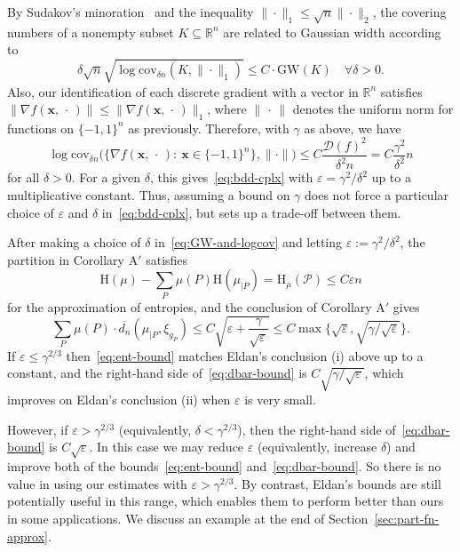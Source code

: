 \documentclass[aop,preprint]{imsart}
\theoremstyle{remark}
\renewcommand{\bf}[1]{\boldsymbol{#1}}
\renewcommand{\rm}[1]{\mathrm{#1}}
\renewcommand{\cal}[1]{\mathcal{#1}}
\newcommand{\bbR}{\mathbb{R}}
\newcommand{\rmH}{\mathrm{H}}
\renewcommand{\P}{\mathcal{P}}
\newcommand{\eps}{\varepsilon}
\newcommand{\g}{\gamma}
\newcommand{\ol}[1]{\overline{#1}}
\newcommand{\cov}{\mathrm{cov}}
\begin{document}
By Sudakov's minoration~\cite[Theorem 3.18]{LedTal--book} and the inequality $\|\cdot\|_1 \leq \sqrt{n}\|\cdot\|_2$, the covering numbers of a nonempty subset $K \subseteq \bbR^n$ are related to Gaussian width according to
\[\delta \sqrt{n}\sqrt{\log \cov_{\delta n}(K,\|\cdot\|_1)} \leq C\cdot  \rm{GW}(K) \quad \forall \delta > 0. \]
Also, our identification of each discrete gradient with a vector in $\bbR^n$ satisfies $\|\nabla f(\bf{x},\,\cdot\,)\| \leq \|\nabla f(\bf{x},\,\cdot\,)\|_1$, where $\|\,\cdot\,\|$ denotes the uniform norm for functions on $\{-1,1\}^n$ as previously.  Therefore, with $\g$ as above, we have
\begin{equation}\label{eq:GW-and-logcov}
\log \cov_{\delta n}\big(\{\nabla f(\bf{x},\,\cdot\,):\ \bf{x} \in \{-1,1\}^n\},\|\cdot\|\big) \leq C\frac{\cal{D}(f)^2}{\delta^2n} = C\frac{\g^2}{\delta^2}n
\end{equation}
for all $\delta > 0$. For a given $\delta$, this gives~\eqref{eq:bdd-cplx} with $\eps = \g^2/\delta^2$ up to a multiplicative constant.  Thus, assuming a bound on $\g$ does not force a particular choice of $\eps$ and $\delta$ in~\eqref{eq:bdd-cplx}, but sets up a trade-off between them.

After making a choice of $\delta$ in~\eqref{eq:GW-and-logcov} and letting $\eps := \g^2/\delta^2$, the partition in Corollary A$'$ satisfies
\begin{equation}\label{eq:ent-bound}
\rmH(\mu) - \sum_P\mu(P)\rmH(\mu_{|P}) = \rmH_\mu(\P) \leq C\eps n
\end{equation}
for the approximation of entropies, and the conclusion of Corollary A$'$ gives
\begin{equation}\label{eq:dbar-bound}
\sum_P \mu(P)\cdot \ol{d_n}(\mu_{|P},\xi_{g_P}) \leq C\sqrt{\eps + \frac{\g}{\sqrt{\eps}}} \leq C\max\Big\{\sqrt{\eps},\sqrt{\g/\sqrt{\eps}}\Big\}.
\end{equation}
If $\eps \leq \g^{2/3}$ then~\eqref{eq:ent-bound} matches Eldan's conclusion (i) above up to a constant, and the right-hand side of~\eqref{eq:dbar-bound} is $C\sqrt{\g/\sqrt{\eps}}$, which improves on Eldan's conclusion (ii) when $\eps$ is very small.

However, if $\eps > \g^{2/3}$ (equivalently, $\delta < \g^{2/3}$), then the right-hand side of~\eqref{eq:dbar-bound} is $C\sqrt{\eps}$.  In this case we may reduce $\eps$ (equivalently, increase $\delta$) and improve both of the bounds~\eqref{eq:ent-bound} and~\eqref{eq:dbar-bound}. So there is no value in using our estimates with $\eps > \g^{2/3}$.  By contrast, Eldan's bounds are still potentially useful in this range, which enables them to perform better than ours in some applications. We discuss an example at the end of Section~\ref{sec:part-fn-approx}.
\end{document}
